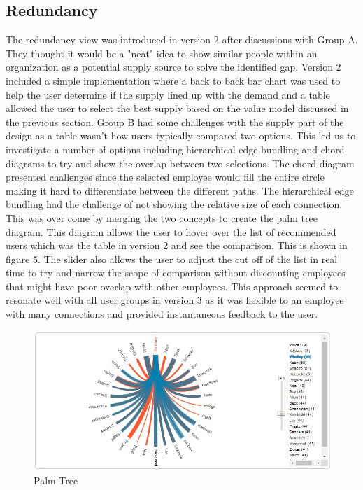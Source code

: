 \documentclass[journal]{vgtc}                %
\begin{document}
\subsection{Redundancy}

The redundancy view was introduced in version 2 after discussions with Group A.  They thought it would be a "neat" idea to show similar people within an organization as a potential supply source to solve the identified gap.  Version 2 included a simple implementation where a back to back bar chart was used to help the user determine if the supply lined up with the demand and a table allowed the user to select the best supply based on the value model discussed in the previous section.
Group B had some challenges with the supply part of the design as a table wasn't how users typically compared two options.  This led us to investigate a number of options including hierarchical edge bundling and chord diagrams to try and show the overlap between two selections.  The chord diagram presented challenges since the selected employee would fill the entire circle making it hard to differentiate between the different paths.  The hierarchical edge bundling had the challenge of not showing the relative size of each connection.  This was over come by merging the two concepts to create the palm tree diagram.  This diagram allows the user to hover over the list of recommended users which was the table in version 2 and see the comparison.  This is shown in figure 5.  The slider also allows the user to adjust the cut off of the list in real time to try and narrow the scope of comparison without discounting employees that might have poor overlap with other employees.  This approach seemed to resonate well with all user groups in version 3 as it was flexible to an employee with many connections and provided instantaneous feedback to the user. 

\begin{figure}
	\centering
	\includegraphics[width=\columnwidth]{pictures/palmtree.jpg}
	\caption{Palm Tree}
	\label{fig:palm}
\end{figure}
\end{document}
